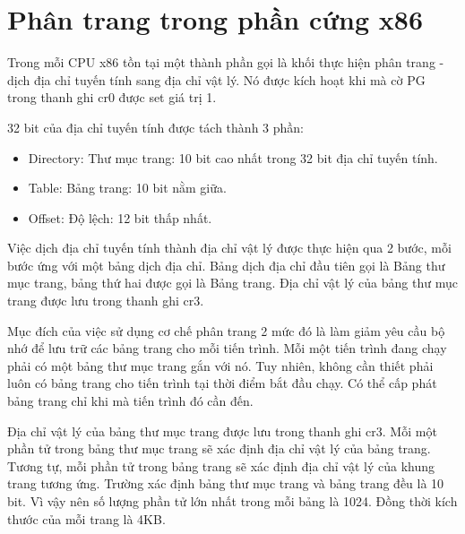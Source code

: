 \documentclass[12pt]{report}
\begin{document}
\section{Phân trang trong phần cứng x86}
Trong mỗi CPU x86 tồn tại một thành phần gọi là khối thực hiện phân trang - dịch địa chỉ tuyến tính sang địa chỉ vật lý. Nó được kích hoạt khi mà cờ PG trong thanh ghi cr0 được set giá trị 1. 

32 bit của địa chỉ tuyến tính được tách thành 3 phần:
\begin{itemize}
\item Directory: Thư mục trang: 10 bit cao nhất trong 32 bit địa chỉ tuyến tính. 
\item Table: Bảng trang: 10 bit nằm giữa.
\item Offset: Độ lệch: 12 bit thấp nhất. 
\end{itemize} 

Việc dịch địa chỉ tuyến tính thành địa chỉ vật lý được thực hiện qua 2 bước, mỗi bước ứng với một bảng dịch địa chỉ. Bảng dịch địa chỉ đầu tiên gọi là Bảng thư mục trang, bảng thứ hai được gọi là Bảng trang. Địa chỉ vật lý của bảng thư mục trang được lưu trong thanh ghi cr3.

Mục đích của việc sử dụng cơ chế phân trang 2 mức đó là làm giảm yêu cầu bộ nhớ để lưu trữ các bảng trang cho mỗi tiến trình. Mỗi một tiến trình đang chạy phải có một bảng thư mục trang gắn với nó. Tuy nhiên, không cần thiết phải luôn có bảng trang cho tiến trình tại thời điểm bắt đầu chạy. Có thể cấp phát bảng trang chỉ khi mà tiến trình đó cần đến.

Địa chỉ vật lý của bảng thư mục trang được lưu trong thanh ghi cr3. Mỗi một phần tử trong bảng thư mục trang sẽ xác định địa chỉ vật lý của bảng trang. Tương tự, mỗi phần tử trong bảng trang sẽ xác định địa chỉ vật lý của khung trang tương ứng. Trường xác định bảng thư mục trang và bảng trang đều là 10 bit. Vì vậy nên số lượng phần tử lớn nhất trong mỗi bảng là 1024. Đồng thời kích thước của mỗi trang là 4KB.
\end{document}
